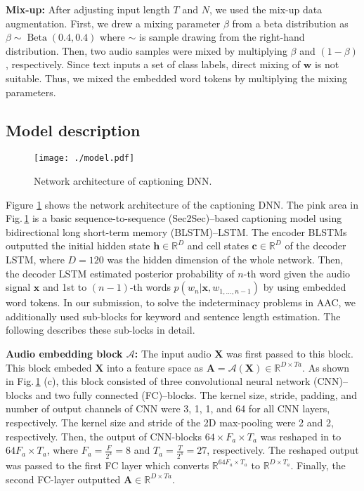 \documentclass{article}
\DeclareMathOperator{\betadist}{Beta}
\begin{document}
\begin{sloppy}
\vspace{3pt}
\noindent
{\bf Mix-up:} 
After adjusting input length $T$ and $N$, we used the mix-up data augmentation.
First, we drew a mixing parameter $\beta$ from a beta distribution as
$
\beta \sim \betadist( 0.4, 0.4 )
$
where $\sim$ is sample drawing from the right-hand distribution.
Then, two audio samples were mixed by multiplying $\beta$ and $(1-\beta)$, respectively.
Since text inputs a set of class labels, direct mixing of $\bm{w}$ is not suitable. Thus, we mixed the embedded word tokens by multiplying the mixing parameters.



\subsection{Model description}

\begin{figure}[t]
  \centering
\texttt{[image: ./model.pdf]} 
  \vspace{-15pt}
  \caption{Network architecture of captioning DNN.}
  \label{fig:modelov}
  \vspace{-10pt}
\end{figure}

Figure \ref{fig:modelov} shows the network architecture of the captioning DNN.
The pink area in Fig.\,\ref{fig:modelov} is a basic sequence-to-sequence (Sec2Sec)--based captioning model \cite{seq2seq1} using bidirectional long short-term memory (BLSTM)--LSTM. 
The encoder BLSTMs outputted the initial hidden state $\bm{h} \in \mathbb{R}^{D}$ and cell states $\bm{c} \in \mathbb{R}^{D}$ of the decoder LSTM, where $D=120$ was the hidden dimension of the whole network.
Then, the decoder LSTM estimated posterior probability of $n$-th word given the audio signal $\bm{x}$ and 1st to $(n-1)$-th words $p( w_n | \bm{x}, w_{1,..., n-1} )$ by using embedded word tokens.
In our submission, to solve the indeterminacy problems in AAC, we additionally used sub-blocks for keyword and sentence length estimation.
The following describes these sub-locks in detail.


\vspace{3pt}
\noindent
{\bf Audio embedding block $\mathcal{A}$:} The input audio $\bm{X}$ was first passed to this block.
This block embeded $\bm{X}$ into a feature space as
$ \bm{A} = \mathcal{A}( \bm{X} ) \in \mathbb{R}^{D \times Ta}.
$
As shown in Fig.\,\ref{fig:modelov} (c), this block consisted of three convolutional neural network (CNN)--blocks and two fully connected (FC)--blocks.
The kernel size, stride, padding, and number of output channels of CNN were 3, 1, 1, and 64 for all CNN layers, respectively.
The kernel size and stride of the 2D max-pooling were 2 and 2, respectively.
Then, the output of CNN-blocks $64 \times F_a \times T_a $ was reshaped in to 
$ 64F_a \times T_a$, where $F_a = \frac{F}{2^3} = 8$ and $T_a = \frac{T}{2^3} = 27$, respectively.
The reshaped output was passed to the first FC layer which converts $\mathbb{R}^{ 64F_a \times T_a }$ to $\mathbb{R}^{ D \times T_a }$.
Finally, the second FC-layer outputted $\bm{A} \in \mathbb{R}^{D \times Ta}$.



\end{sloppy}
\end{document}
